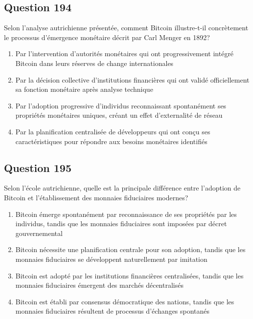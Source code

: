 \documentclass[12pt,a4paper]{article}
\begin{document}
\bigskip


\subsection*{Question 194}
Selon l'analyse autrichienne présentée, comment Bitcoin illustre-t-il concrètement le processus d'émergence monétaire décrit par Carl Menger en 1892?

\begin{enumerate}[label=\Alph*., leftmargin=*]
\item Par l'intervention d'autorités monétaires qui ont progressivement intégré Bitcoin dans leurs réserves de change internationales
\item Par la décision collective d'institutions financières qui ont validé officiellement sa fonction monétaire après analyse technique
\item Par l'adoption progressive d'individus reconnaissant spontanément ses propriétés monétaires uniques, créant un effet d'externalité de réseau
\item Par la planification centralisée de développeurs qui ont conçu ses caractéristiques pour répondre aux besoins monétaires identifiés
\end{enumerate}

\bigskip


\subsection*{Question 195}
Selon l'école autrichienne, quelle est la principale différence entre l'adoption de Bitcoin et l'établissement des monnaies fiduciaires modernes?

\begin{enumerate}[label=\Alph*., leftmargin=*]
\item Bitcoin émerge spontanément par reconnaissance de ses propriétés par les individus, tandis que les monnaies fiduciaires sont imposées par décret gouvernemental
\item Bitcoin nécessite une planification centrale pour son adoption, tandis que les monnaies fiduciaires se développent naturellement par imitation
\item Bitcoin est adopté par les institutions financières centralisées, tandis que les monnaies fiduciaires émergent des marchés décentralisés
\item Bitcoin est établi par consensus démocratique des nations, tandis que les monnaies fiduciaires résultent de processus d'échanges spontanés
\end{enumerate}
\end{document}
